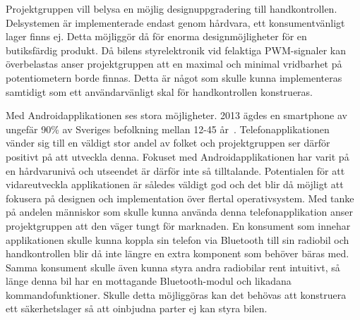 \documentclass[a4paper]{article}
\begin{document}












\vspace{5mm} \noindent
Projektgruppen vill belysa en möjlig designuppgradering till handkontrollen. Delsystemen är implementerade endast genom hårdvara, ett konsumentvänligt lager finns ej. Detta möjliggör då för enorma designmöjligheter för en butiksfärdig produkt. Då bilens styrelektronik vid felaktiga PWM-signaler kan överbelastas anser projektgruppen att en maximal och minimal vridbarhet på potentiometern borde finnas. Detta är något som skulle kunna implementeras samtidigt som ett användarvänligt skal för handkontrollen konstrueras.


\vspace{5mm} \noindent
Med Androidapplikationen ses stora möjligheter. 2013 ägdes en smartphone av ungefär 90\% av Sveriges befolkning mellan 12-45 år~\cite{smartphoneStat}. Telefonapplikationen vänder sig till en väldigt stor andel av folket och projektgruppen ser därför positivt på att utveckla denna. Fokuset med Androidapplikationen har varit på en hårdvarunivå och utseendet är därför inte så tilltalande. Potentialen för att vidareutveckla applikationen är således väldigt god och det blir då möjligt att fokusera på designen och implementation över flertal operativsystem. Med tanke på andelen människor som skulle kunna använda denna telefonapplikation anser projektgruppen att den väger tungt för marknaden. En konsument som innehar applikationen skulle kunna koppla sin telefon via Bluetooth till sin radiobil och handkontrollen blir då inte längre en extra komponent som behöver bäras med. Samma konsument skulle även kunna styra andra radiobilar rent intuitivt, så länge denna bil har en mottagande Bluetooth-modul och likadana kommandofunktioner. Skulle detta möjliggöras kan det behövas att konstruera ett säkerhetslager så att oinbjudna parter ej kan styra bilen.
\end{document}
